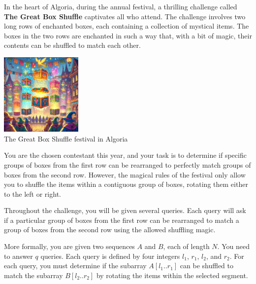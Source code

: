 In the heart of Algoria, during the annual festival, a thrilling challenge called \textbf{The Great Box Shuffle} captivates all who attend. The challenge involves two long rows of enchanted boxes, each containing a collection of mystical items. The boxes in the two rows are enchanted in such a way that, with a bit of magic, their contents can be shuffled to match each other.

\begin{center}
  \def \htmlPixelsInCm {45}  %
  \includegraphics[width=4cm]{box.png} \\
  \small{The Great Box Shuffle festival in Algoria}
\end{center}

You are the chosen contestant this year, and your task is to determine if specific groups of boxes from the first row can be rearranged to perfectly match groups of boxes from the second row. However, the magical rules of the festival only allow you to shuffle the items within a contiguous group of boxes, rotating them either to the left or right.

Throughout the challenge, you will be given several queries. Each query will ask if a particular group of boxes from the first row can be rearranged to match a group of boxes from the second row using the allowed shuffling magic.

More formally, you are given two sequences \( A \) and \( B \), each of length \( N \). You need to answer \( q \) queries. Each query is defined by four integers \( l_1 \), \( r_1 \), \( l_2 \), and \( r_2 \). For each query, you must determine if the subarray \( A[l_1..r_1] \) can be shuffled to match the subarray \( B[l_2..r_2] \) by rotating the items within the selected segment.